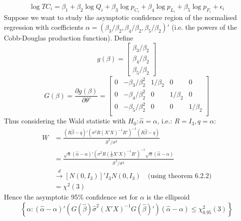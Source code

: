 \documentclass[DIV=14,titlepage=false]{scrreprt}
\begin{document}
\begin{example}
    \[ \log TC_i = \beta_1 + \beta_2 \log Q_i + \beta_3 \log p_{C_i} + \beta_4 \log p_{L_i}+ \beta_5 \log p_{F_i} + \epsilon_i \]Suppose we want to study the asymptotic confidence region of the normalised regression with coefficients $\alpha = (\beta_3/\beta_2,\beta_4/\beta_2,\beta_5/\beta_2)'$ (i.e. the powers of the Cobb-Douglas production function). Define \[ g(\beta) = \begin{bmatrix}
        \beta_3/\beta_2\\
        \beta_4/\beta_2\\
        \beta_5/\beta_2
    \end{bmatrix}
\]
\[
    G(\beta) = \frac{\partial g(\beta)}{\partial \theta'} = \begin{bmatrix}
        0 & -\beta_3/\beta_2^2 & 1/\beta_2 & 0 & 0\\
        0 & -\beta_4/\beta_2^2 & 0 & 1/\beta_2 & 0\\
        0 & -\beta_5/\beta_2^2 & 0 & 0 & 1/\beta_2\\
    \end{bmatrix}
\]
Thus considering the Wald statistic with $H_0: \hat \alpha = \alpha$, i.e.: $R=I_3, q=\alpha$:
\begin{align*}
    W &= \frac{\left(R\hat\beta-q\right)'\left(\sigma^2R\left(X'X\right)^{-1}R'\right)^{-1}\left(R\hat\beta-q\right)}{\hat\sigma^2/\sigma^2}\\
    &= \frac{\sqrt{n}\left(\hat \alpha - \alpha \right)'\left(\sigma^2R\left(\frac{1}{n}X'X\right)^{-1}R'\right)^{-1}\sqrt{n}\left(\hat \alpha - \alpha\right)}{\hat\sigma^2/\sigma^2}\\
    &\overset{d}{\to} [N(0,I_3)]'I_3 N(0,I_3)\quad \text{(using theorem 6.2.2)}\\
    &= \chi^2(3)
\end{align*}
Hence the asymptotic 95\% confidence set for $\alpha$ is the ellipsoid
\[ \left\{ \alpha : (\hat \alpha - \alpha)'\left( G(\hat\beta)\hat\sigma^2(X'X)^{-1}G(\hat\beta)'\right)(\hat \alpha - \alpha) \leq \chi^2_{0.95}(3) \right\} \]


\end{example}
\end{document}

